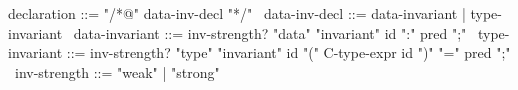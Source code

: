 \begin{syntax}
  declaration ::= "/*@" data-inv-decl "*/" 
  \
  data-inv-decl ::= data-invariant | type-invariant
  \
  data-invariant ::= inv-strength? "data" "invariant" id ":" pred ";"
  \
  type-invariant ::= inv-strength? "type" "invariant" id "(" C-type-expr id ")" "=" pred ";"
  \
  inv-strength ::= "weak" | "strong"
\end{syntax}